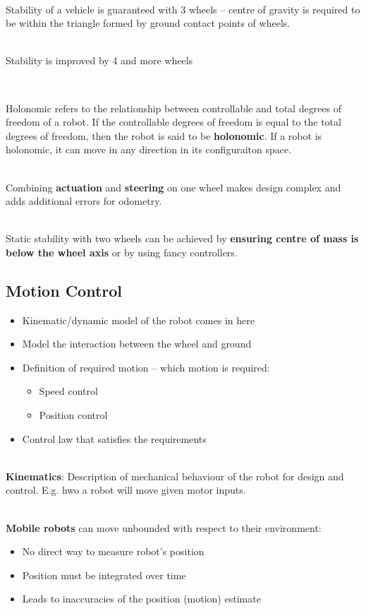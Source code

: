 \documentclass[13pt]{article}
\begin{document}
\hfill \\
\noindent
Stability of a vehicle is guaranteed with 3 wheels -- centre of gravity is required to be within the triangle formed by
ground contact points of wheels.

\hfill\\
\noindent
Stability is improved by 4 and more wheels

\hfill \\
\noindent
\begin{defn}{Holonomic}
	refers to the relationship between controllable and total degrees of freedom of a robot. If the controllable degrees
	of freedom is equal to the total degrees of freedom, then the robot is said to be \textbf{holonomic}. If a robot is
	holonomic, it can move in any direction in its configuraiton space.
\end{defn}

\hfill \\
\noindent
Combining \textbf{actuation} and \textbf{steering} on one wheel makes design complex and adds additional errors for
odometry.

\hfill \\
\noindent
Static stability with two wheels can be achieved by \textbf{ensuring centre of mass is below the wheel axis} or by using
fancy controllers.

\subsection{Motion Control}%
\begin{itemize}
	\item Kinematic/dynamic model of the robot comes in here
	\item Model the interaction between the wheel and ground
	\item Definition of required motion -- which motion is required:
	\begin{itemize}
		\item Speed control
		\item Position control
	\end{itemize}
	\item Control law that satisfies the requirements
\end{itemize}

\hfill \\
\noindent
\textbf{Kinematics}: Description of mechanical behaviour of the robot for design and control. E.g. hwo a robot will move
given motor inputs.

\hfill \\
\noindent
\textbf{Mobile robots} can move unbounded with respect to their environment:
\begin{itemize}
	\item No direct way to measure robot's position
	\item Position must be integrated over time
	\item Leads to inaccuracies of the position (motion) estimate
\end{itemize}
\end{document}
